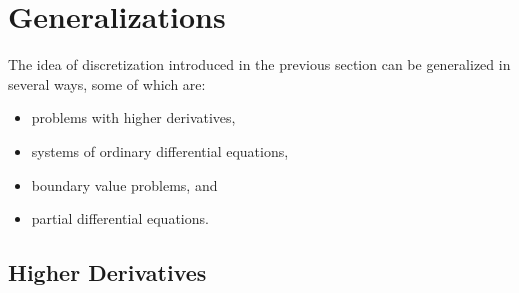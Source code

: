 % 
%
%
%
%
%
%
%
%
%
%
%
%

\section{Generalizations}

\begin{latexonly}
\end{latexonly}

The idea of discretization introduced in the previous section can be
generalized in several ways, some of which are:
\begin{itemize}
\item problems with higher derivatives,
\item systems of ordinary differential equations,
\item boundary value problems, and
\item partial differential equations.
\end{itemize}

\subsection{Higher Derivatives}

